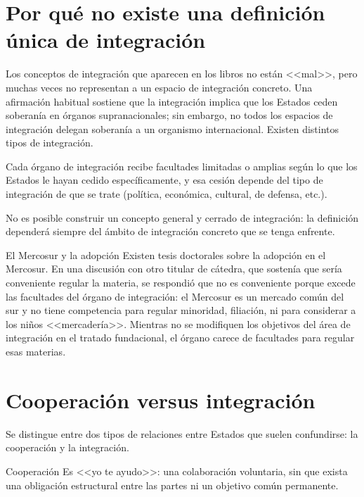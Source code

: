 \documentclass[12pt,oneside]{book}
\begin{document}
\section{Por qué no existe una definición única de integración}

Los conceptos de integración que aparecen en los libros no están <<mal>>, pero muchas veces no representan a un espacio de integración concreto. Una afirmación habitual sostiene que la integración implica que los Estados ceden soberanía en órganos supranacionales; sin embargo, no todos los espacios de integración delegan soberanía a un organismo internacional. Existen distintos tipos de integración.

Cada órgano de integración recibe facultades limitadas o amplias según lo que los Estados le hayan cedido específicamente, y esa cesión depende del tipo de integración de que se trate (política, económica, cultural, de defensa, etc.).

\begin{important}
No es posible construir un concepto general y cerrado de integración: la definición dependerá siempre del ámbito de integración concreto que se tenga enfrente.
\end{important}

\begin{example}{El Mercosur y la adopción}
Existen tesis doctorales sobre la adopción en el Mercosur. En una discusión con otro titular de cátedra, que sostenía que sería conveniente regular la materia, se respondió que no es conveniente porque excede las facultades del órgano de integración: el Mercosur es un mercado común del sur y no tiene competencia para regular minoridad, filiación, ni para considerar a los niños <<mercadería>>. Mientras no se modifiquen los objetivos del área de integración en el tratado fundacional, el órgano carece de facultades para regular esas materias.
\end{example}

\section{Cooperación versus integración}

Se distingue entre dos tipos de relaciones entre Estados que suelen confundirse: la cooperación y la integración.

\begin{definition}{Cooperación}
Es <<yo te ayudo>>: una colaboración voluntaria, sin que exista una obligación estructural entre las partes ni un objetivo común permanente.
\end{definition}
\end{document}
